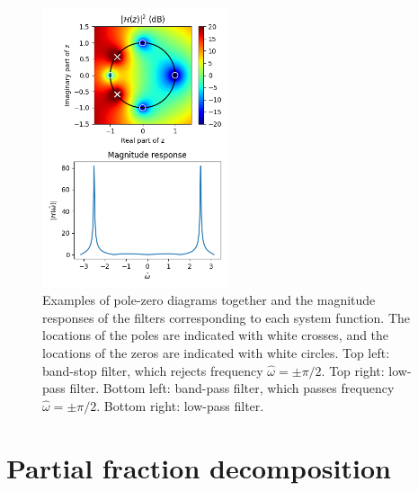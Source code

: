 \begin{figure}
\begin{center}
\includegraphics[width=0.49\textwidth]{code/026_iir/ex8.png}
\end{center}
\caption{Examples of pole-zero diagrams together and the magnitude responses of the filters corresponding to each system function. The locations of the poles are indicated with white crosses, and the locations of the zeros are indicated with white circles. Top left: band-stop filter, which rejects frequency $\hat{\omega}=\pm\pi/2$. Top right: low-pass filter. Bottom left: band-pass filter, which passes frequency $\hat{\omega}=\pm \pi/2$. Bottom right: low-pass filter.}
\label{fig:pz_examples2}
\end{figure}
\fi

\section{Partial fraction decomposition}

